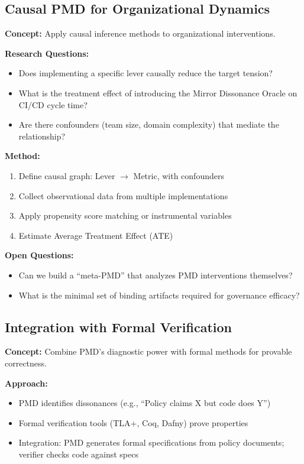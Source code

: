 \documentclass[11pt,a4paper]{article}
\begin{document}
\subsection{Causal PMD for Organizational Dynamics}

\textbf{Concept:} Apply causal inference methods to organizational interventions.

\textbf{Research Questions:}
\begin{itemize}
\item Does implementing a specific lever causally reduce the target tension?
\item What is the treatment effect of introducing the Mirror Dissonance Oracle on CI/CD cycle time?
\item Are there confounders (team size, domain complexity) that mediate the relationship?
\end{itemize}

\textbf{Method:}
\begin{enumerate}
\item Define causal graph: Lever $\rightarrow$ Metric, with confounders
\item Collect observational data from multiple implementations
\item Apply propensity score matching or instrumental variables
\item Estimate Average Treatment Effect (ATE)
\end{enumerate}

\textbf{Open Questions:}
\begin{itemize}
\item Can we build a ``meta-PMD'' that analyzes PMD interventions themselves?
\item What is the minimal set of binding artifacts required for governance efficacy?
\end{itemize}

\subsection{Integration with Formal Verification}

\textbf{Concept:} Combine PMD's diagnostic power with formal methods for provable correctness.

\textbf{Approach:}
\begin{itemize}
\item PMD identifies dissonances (e.g., ``Policy claims X but code does Y'')
\item Formal verification tools (TLA+, Coq, Dafny) prove properties
\item Integration: PMD generates formal specifications from policy documents; verifier checks code against specs
\end{itemize}
\end{document}
